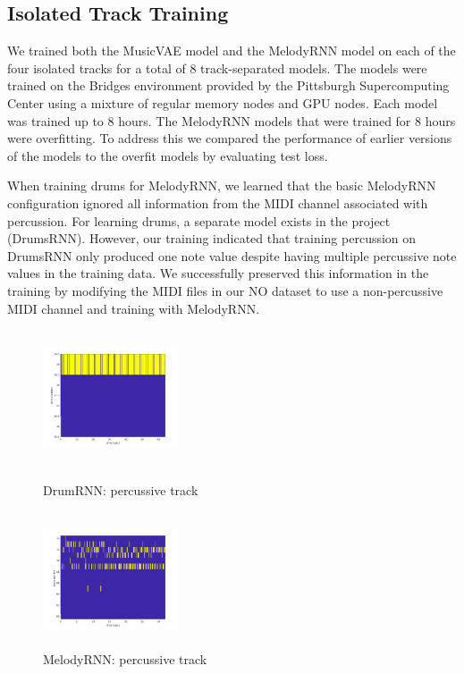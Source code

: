 \documentclass{article}
\begin{document}
\subsection{Isolated Track Training}
We trained both the MusicVAE model and the MelodyRNN model on each of the four isolated tracks for a total of 8 track-separated models. The models were trained on the Bridges environment provided by the Pittsburgh Supercomputing Center using a mixture of regular memory nodes and GPU nodes. Each model was trained up to 8 hours. The MelodyRNN models that were trained for 8 hours were overfitting. To address this we compared the performance of earlier versions of the models to the overfit models by evaluating test loss.

When training drums for MelodyRNN, we learned that the basic MelodyRNN configuration ignored all information from the MIDI channel associated with percussion. For learning drums, a separate model exists in the project (DrumsRNN). However, our training indicated that training percussion on DrumsRNN only produced one note value despite having multiple percussive note values in the training data. We successfully preserved this information in the training by modifying the MIDI files in our NO dataset to use a non-percussive MIDI channel and training with MelodyRNN.

\begin{figure}[htb!]
  \begin{minipage}{0.48\textwidth}
    \centering
    \includegraphics[height=4cm, width=4cm]{img/DrumRNN_drum.jpg}
    \caption{DrumRNN: percussive track}
  \end{minipage}\hfill
  \begin{minipage}{0.48\textwidth}
    \centering
    \includegraphics[height=4cm, width=4cm]{img/MelodyRNN_drum.jpg}
    \caption{MelodyRNN: percussive track}
  \end{minipage}
\end{figure}
\end{document}
